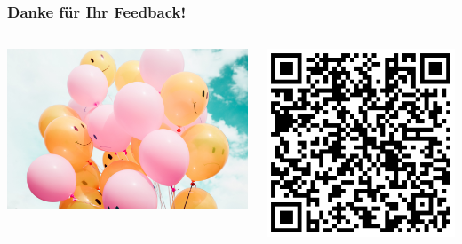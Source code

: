 \documentclass{beamer}
\begin{document}
\begin{frame}
\frametitle{Danke für Ihr Feedback!}

\begin{columns}[c]

\begin{column}{6cm}
\begin{center}
 \includegraphics[width=\textwidth]{smilie_balloons.jpg}
\end{center}

\end{column}

\begin{column}{4cm}


\begin{center}
\includegraphics[width=\textwidth]{feedback_QR.png}
\end{center}
\end{column}


\end{columns}
\end{frame}
\end{document}
